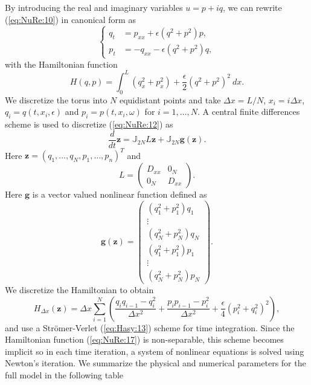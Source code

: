 \documentclass[final]{siamart}
\begin{document}
By introducing the real and imaginary variables $u = p + iq$, we can rewrite (\ref{eq:NuRe:10}) in canonical form as
\begin{equation} \label{eq:NuRe:12}
\left\{
\begin{aligned}
 q_t &= p_{xx} + \epsilon (q^2+p^2)p, \\
 p_t &= -q_{xx} - \epsilon (q^2 + p^2)q,
\end{aligned}
\right.
\end{equation}
with the Hamiltonian function
\begin{equation} \label{eq:NuRe:13}
	H(q,p) = \int_{0}^{L} (q_x^2 + p_x^2) + \frac \epsilon 2 (q^2 + p^2)^2\ dx.
\end{equation}
We discretize the torus into $N$ equidistant points and take $\Delta x = L/N$, $x_i = i\Delta x$, $q_i=q(t,x_i,\epsilon)$ and $p_i = p(t,x_i,\omega)$ for $i = 1 ,\dots,N$. A central finite differences scheme is used to discretize (\ref{eq:NuRe:12}) as
\begin{equation}  \label{eq:NuRe:14}
	\frac{d}{dt} \mathbf z = \mathbb J_{2N} L\mathbf z + \mathbb J_{2N} \mathbf g(\mathbf z).
\end{equation}
Here $\mathbf z = (q_1,\dots,q_N,p_1,\dots,p_n)^T$ and
\begin{equation}  \label{eq:NuRe:15}
	L = 
	\begin{pmatrix}
		D_{xx} & 0_N \\
		0_N & D_{xx}
	\end{pmatrix}.
\end{equation}
Here $\mathbf g$ is a vector valued nonlinear function defined as
\begin{equation}  \label{eq:NuRe:16}
	\mathbf g(\mathbf z) =
	\begin{pmatrix}
	(q_1^2 + p_1^2)q_1 \\
	\vdots \\
	(q_N^2 + p_N^2)q_N \\
	(q_1^2 + p_1^2)p_1 \\
	\vdots \\
	(q_N^2 + p_N^2)p_N
	\end{pmatrix}.
\end{equation}
We discretize the Hamiltonian to obtain
\begin{equation}  \label{eq:NuRe:17}
	H_{\Delta x}(\mathbf z) = {\Delta x}\sum_{i=1}^{N} \left( \frac{q_i q_{i-1} - q_i^2}{\Delta x ^2} + \frac{p_i p_{i-1} - p_i^2}{\Delta x ^2} + \frac \epsilon 4 (p_i^2 + q_i^2)^2  \right),
\end{equation}
and use a Str\"omer-Verlet (\ref{eq:Hasy:13}) scheme for time integration. Since the Hamiltonian function (\ref{eq:NuRe:17}) is non-separable, this scheme becomes implicit so in each time iteration, a system of nonlinear equations is solved using Newton's iteration. We summarize the physical and numerical parameters for the full model in the following table
\end{document}
